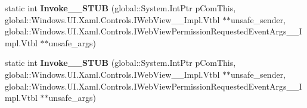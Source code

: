\begin{DoxyCompactItemize}
\mbox{\label{struct_windows_1_1_foundation_1_1_typed_event_handler___a___windows___u_i___xaml___controls___we02730dfc82c56beef290621040cade95_a647a89ab3e74a2c84cefc4b606a57a60}} 
static int {\bfseries Invoke\+\_\+\+\_\+\+S\+T\+UB} (global\+::\+System.\+Int\+Ptr p\+Com\+This, global\+::\+Windows.\+U\+I.\+Xaml.\+Controls.\+I\+Web\+View\+\_\+\+\_\+\+Impl.\+Vtbl $\ast$$\ast$unsafe\+\_\+sender, global\+::\+Windows.\+U\+I.\+Xaml.\+Controls.\+I\+Web\+View\+Permission\+Requested\+Event\+Args\+\_\+\+\_\+\+Impl.\+Vtbl $\ast$$\ast$unsafe\+\_\+args)
\item 
\mbox{\label{struct_windows_1_1_foundation_1_1_typed_event_handler___a___windows___u_i___xaml___controls___we02730dfc82c56beef290621040cade95_a647a89ab3e74a2c84cefc4b606a57a60}} 
static int {\bfseries Invoke\+\_\+\+\_\+\+S\+T\+UB} (global\+::\+System.\+Int\+Ptr p\+Com\+This, global\+::\+Windows.\+U\+I.\+Xaml.\+Controls.\+I\+Web\+View\+\_\+\+\_\+\+Impl.\+Vtbl $\ast$$\ast$unsafe\+\_\+sender, global\+::\+Windows.\+U\+I.\+Xaml.\+Controls.\+I\+Web\+View\+Permission\+Requested\+Event\+Args\+\_\+\+\_\+\+Impl.\+Vtbl $\ast$$\ast$unsafe\+\_\+args)
\end{DoxyCompactItemize}
